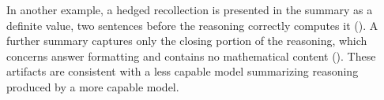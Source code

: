 In another example, a hedged recollection is presented in the summary as a definite value, two sentences before the reasoning correctly computes it (). A further summary captures only the closing portion of the reasoning, which concerns answer formatting and contains no mathematical content (). These artifacts are consistent with a less capable model summarizing reasoning produced by a more capable model.

